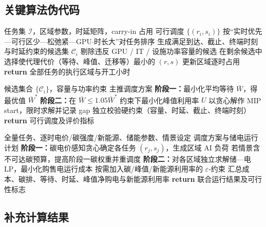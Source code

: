 \documentclass[UTF8,a4paper,zihao=-4]{ctexart}
\begin{document}
\subsection{关键算法伪代码}

\begin{algorithm}[H]
\caption{问题一动态贪心可行调度}
\label{alg:q1-greedy}
\begin{algorithmic}[1]
\REQUIRE 任务集 $\mathcal{I}$，区域参数，时延矩阵，carry-in 占用
\ENSURE 可行调度 $\{(r_i,s_i)\}$
\STATE 按“实时优先—可行区少—松弛紧—GPU$\cdot$时长大”对任务排序
    \STATE 生成满足到达、截止、终端时刻与时延约束的候选集 $\mathcal{C}_i$
    \STATE 剔除违反 GPU / IT / 设施功率容量的候选
    \STATE 在剩余候选中选择使代理代价（等待、峰值、迁移等）最小的 $(r,s)$
    \STATE 更新区域逐时占用
\ENDFOR
\STATE \textbf{return} 全部任务的执行区域与开工小时
\end{algorithmic}
\end{algorithm}

\begin{algorithm}[H]
\caption{问题一字典序 MILP（等待优先，再削峰）}
\label{alg:q1-lex}
\begin{algorithmic}[1]
\REQUIRE 候选集合 $\{\mathcal{C}_i\}$，容量与功率约束
\ENSURE 主推调度方案
\STATE \textbf{阶段一：}最小化平均等待 $\bar{W}$，得最优值 $\bar{W}^\ast$
\STATE \textbf{阶段二：}在 $\bar{W}\le 1.05\bar{W}^\ast$ 约束下最小化峰值利用率 $U$
\STATE 以贪心解作 MIP start，限时求解并记录 gap
\STATE 独立校验硬约束（容量、时延、截止、终端时刻）
\STATE \textbf{return} 可行调度及评价指标
\end{algorithmic}
\end{algorithm}

\begin{algorithm}[H]
\caption{问题四两阶段算电协同}
\label{alg:q4-two-stage}
\begin{algorithmic}[1]
\REQUIRE 全量任务、逐时电价/碳强度/新能源、储能参数、情景设定
\ENSURE 调度方案与储电运行计划
\STATE \textbf{阶段一：}碳电价感知贪心确定各任务 $(r_j,s_j)$，生成区域 AI 负荷
\STATE 若情景含不可达碳预算，提高阶段一碳权重并重调度
\STATE \textbf{阶段二：}对各区域独立求解储—电 LP，最小化购售电运行成本
\STATE 按需加入碳/峰值/新能源利用率的 $\varepsilon$-约束
\STATE 汇总成本、碳排、等待、时延、峰值净购电与新能源利用率
\STATE \textbf{return} 联合运行结果及可行性标志
\end{algorithmic}
\end{algorithm}

\subsection{补充计算结果}
\end{document}
